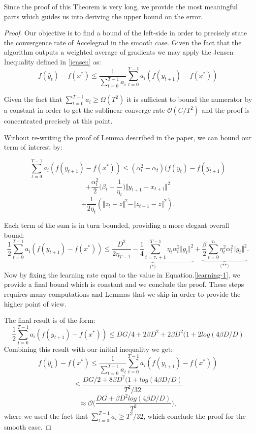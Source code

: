 \documentclass[12pt]{article}
\theoremstyle{definition}
\begin{document}
Since the proof of this Theorem is very long, we provide the most meaningful parts which guides us into deriving the upper bound on the error. 

\begin{proof}
Our objective is to find a bound of the left-side in order to precisely state the convergence rate of Accelegrad in the smooth case. Given the fact that the algorithm outputs a weighted average of gradients we may apply the Jensen Inequality defined in \ref{jensen} as:
$$
	f(\hat y_t) - f(x^*)	 \leq \frac{1}{\sum_{t=0}^{T-1} a_i} \sum_{t=0}^{T-1} a_i ( f(y_{t+1}) - f(x^*) )
$$

Given the fact that $\sum_{t=0}^{T-1} a_i \geqslant \Omega(T^2) $ it is sufficient to bound the numerator by a constant in order to get the sublinear converge rate $\mathcal{O}(C/T^2)$ and the proof is concentrated precisely at this point. 

Without re-writing the proof of Lemma described in the paper, we can bound our term of interest by:

$$
	\sum_{t=0}^{T-1} a_i ( f(y_{t+1}) - f(x^*) )	 \leq (\alpha_t^2 - \alpha_t)(f(y_t)-f(y_{t+1})
$$
$$
+ \frac{\alpha_t^2}{2}\bigg(\beta_t - \frac{1}{\eta_t}\bigg) \Vert y_{t+1} - x_{t+1} \Vert^2 
$$
$$ 
+ \frac{1}{2\eta_t}(\Vert z_t - z \Vert^2 - \Vert z_{t+1} - z \Vert^2).
$$

Each term of the sum is in turn bounded, providing a more elegant overall bound:
$$
\frac{1}{2} \sum_{t=0}^{T-1} a_i ( f(y_{t+1}) - f(x^*) )	 \leq \underbrace{\frac{D^2}{2 \eta_{T-1}} - \frac{1}{4} \sum_{t=\tau_*+1}^{T-1} \eta_t \alpha_t^2 \Vert g_t \Vert^2}_\text{(*)} + \underbrace{\frac{\beta}{2} \sum_{t=0}^{\tau_*} \eta_t^2 \alpha_t^2 \Vert g_t \Vert^2}_\text{(**)}.
$$
Now by fixing the learning rate equal to the value in Equation.\ref{learning-1}, we provide a final bound which is constant and we conclude the proof. These steps requires many computations and Lemmas that we skip in order to provide the higher point of view. 

The final result is of the form:
$$
\frac{1}{2} \sum_{t=0}^{T-1} a_i ( f(y_{t+1}) - f(x^*) )	 \leq DG/4 + 2\beta D^2 + 2\beta D^2 (1 + 2log(4\beta D / D)
$$
Combining this result with our initial inequality we get:
$$
f(\hat y_t) - f(x^*) \leq \frac{1}{\sum_{t=0}^{T-1} a_i} \sum_{t=0}^{T-1} a_i ( f(y_{t+1}) - f(x^*) ) 
$$
$$
\leq \frac{DG/2 + 8\beta D^2(1 + log(4\beta D / D)}{T^2 / 32}
$$
$$
\approx \mathcal{O} \bigg( \frac{DG + \beta D^2 log(4\beta D / D)}{T^2} \bigg),
$$
where we used the fact that $\sum_{t=0}^{T-1} a_i \geqslant T^2 / 32 $, which conclude the proof for the smooth case.
\end{proof}
\end{document}
